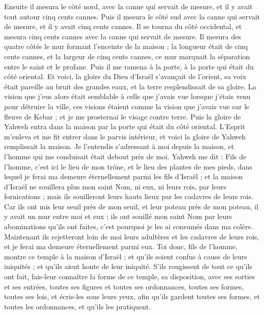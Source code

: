 \begin{multicols}{2}
Ensuite il mesura le côté nord, avec la canne qui servait de mesure, et il y avait tout autour cinq cents cannes.
Puis il mesura le côté sud avec la canne qui servait de mesure, et il y avait cinq cents cannes.
Il se tourna du côté occidental, et mesura cinq cents cannes avec la canne qui servait de mesure.
Il mesura des quatre côtés le mur formant l’enceinte de la maison ; la longueur était de cinq cents cannes, et la largeur de cinq cents cannes, ce mur marquait la séparation entre le saint et le profane.
\VerseOne{}Puis il me ramena à la porte, à la porte qui était du côté oriental.
Et voici, la gloire du Dieu d'Israël s’avançait de l'orient, sa voix était pareille au bruit des grandes eaux, et la terre resplendissait de sa gloire.
La vision que j'eus alors était semblable à celle que j'avais vue lorsque j'étais venu pour détruire la ville, ces visions étaient comme la vision que j'avais vue sur le fleuve de Kebar ; et je me prosternai le visage contre terre.
Puis la gloire de Yahweh entra dans la maison par la porte qui était du côté oriental.
L'Esprit m'enleva et me fit entrer dans le parvis intérieur, et voici la gloire de Yahweh remplissait la maison.
Je l'entendis s'adressant à moi depuis la maison, et l'homme qui me conduisait était debout près de moi.
Yahweh me dit : Fils de l’homme, c'est ici le lieu de mon trône, et le lieu des plantes de mes pieds, dans lequel je ferai ma demeure éternellement parmi les fils d'Israël ; et la maison d'Israël ne souillera plus mon saint Nom, ni eux, ni leurs rois, par leurs fornications ; mais ils souilleront leurs hauts lieux par les cadavres de leurs rois.
Car ils ont mis leur seuil près de mon seuil, et leur poteau près de mon poteau, il y avait un mur entre moi et eux ; ils ont souillé mon saint Nom par leurs abominations qu’ils ont faites, c'est pourquoi je les ai consumés dans ma colère.
Maintenant ils rejetteront loin de moi leurs adultères et les cadavres de leurs rois, et je ferai ma demeure éternellement parmi eux.
Toi donc, fils de l’homme, montre ce temple à la maison d’Israël ; et qu'ils soient confus à cause de leurs iniquités ; et qu'ils aient honte de leur iniquité.
S’ils rougissent de tout ce qu'ils ont fait, fais-leur connaître la forme de ce temple, sa disposition, avec ses sorties et ses entrées, toutes ses figures et toutes ses ordonnances, toutes ses formes, toutes ses lois, et écris-les sous leurs yeux, afin qu'ils gardent toutes ses formes, et toutes les ordonnances, et qu'ils les pratiquent.

\end{multicols}
